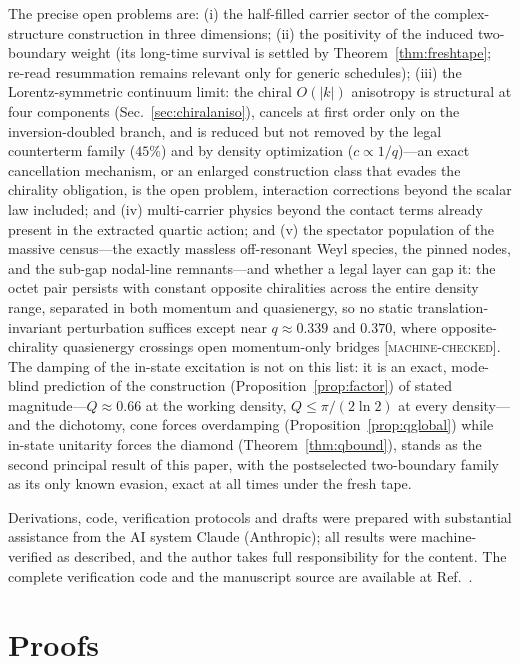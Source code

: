 \documentclass[aps,prd,twocolumn,superscriptaddress,nofootinbib,floatfix]{revtex4-2}
\newcommand{\evM}{\textnormal{\textsc{[machine-checked]}}}
\begin{document}
The precise open problems are: (i) the half-filled carrier sector of the
complex-structure construction in three dimensions; (ii) the positivity of the
induced two-boundary weight (its long-time survival is settled by
Theorem~\ref{thm:freshtape}; re-read resummation remains relevant only
for generic schedules);
(iii) the Lorentz-symmetric continuum limit: the chiral $O(|k|)$
anisotropy is structural at four components
(Sec.~\ref{sec:chiralaniso}), cancels at first order only on the
inversion-doubled branch, and is reduced but not removed by the legal
counterterm family ($45\%$) and by density optimization
($c\propto1/q$)---an exact cancellation mechanism, or an enlarged
construction class that evades the chirality obligation, is the open
problem, interaction corrections beyond the scalar law included; and
(iv) multi-carrier physics beyond the contact terms already present in the
extracted quartic action; and (v) the spectator population of the
massive census---the exactly massless off-resonant Weyl species, the
pinned nodes, and the sub-gap nodal-line remnants---and whether a legal
layer can gap it: the octet pair persists with constant opposite
chiralities across the entire density range, separated in both momentum
and quasienergy, so no static translation-invariant perturbation
suffices except near $q\approx0.339$ and $0.370$, where
opposite-chirality quasienergy crossings open momentum-only bridges
\evM{}. The damping of the in-state excitation is
not on this list: it is an exact, mode-blind prediction of the
construction (Proposition~\ref{prop:factor}) of stated
magnitude---$Q\approx0.66$ at the working density, $Q\le\pi/(2\ln2)$ at
every density---and the dichotomy, cone forces overdamping
(Proposition~\ref{prop:qglobal}) while in-state unitarity forces the
diamond (Theorem~\ref{thm:qbound}), stands as the
second principal result of this paper, with the postselected
two-boundary family as its only known evasion, exact at all times under
the fresh tape.

\begin{acknowledgments}
Derivations, code, verification protocols and drafts were prepared with
substantial assistance from the AI system Claude (Anthropic); all results
were machine-verified as described, and the author takes full
responsibility for the content. The complete verification code and the
manuscript source are available at Ref.~\cite{repo}.
\end{acknowledgments}


\appendix

\section{Proofs}
\label{app:proofs}
\end{document}
